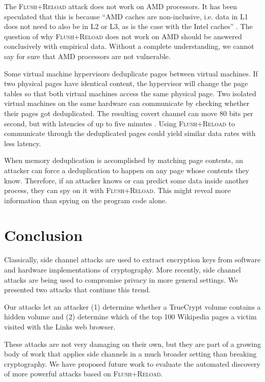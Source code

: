 \documentclass[letterpaper,twocolumn,10pt]{article}
\begin{document}
The \textsc{Flush+Reload} attack does not work on AMD processors. It has been
speculated that this is because ``AMD caches are non-inclusive, i.e. data in L1
does not need to also be in L2 or L3, as is the case with the Intel caches''
\cite{yarom2013flush}. The question of why \textsc{Flush+Reload} does not work
on AMD should be answered conclusively with empirical data. Without a complete
understanding, we cannot say for sure that AMD processors are not vulnerable. 

Some virtual machine hypervisors deduplicate pages between virtual machines. If
two physical pages have identical content, the hypervisor will change the page
tables so that both virtual machines access the same physical page. Two isolated
virtual machines on the same hardware can communicate by checking whether their
pages got deduplicated. The resulting covert channel can move 80 bits per
second, but with latencies of up to five minutes \cite{xiao2013security}. Using
\textsc{Flush+Reload} to communicate through the deduplicated pages could yield
similar data rates with less latency.

When memory deduplication is accomplished by matching page contents, an attacker
can force a deduplication to happen on any page whose contents they know.
Therefore, if an attacker knows or can predict some data inside another process,
they can spy on it with \textsc{Flush+Reload}. This might reveal more
information than spying on the program code alone.

\section{Conclusion}
\label{sec:conclusion}

Classically, side channel attacks are used to extract encryption keys from
software and hardware implementations of cryptography. More recently, side
channel attacks are being used to compromise privacy in more general settings.
We presented two attacks that continue this trend. 

Our attacks let an attacker (1) determine whether a TrueCrypt volume contains
a hidden volume and (2) determine which of the top 100 Wikipedia pages a victim
visited with the Links web browser.

These attacks are not very damaging on their own, but they are part of a growing
body of work that applies side channels in a much broader setting than breaking
cryptography. We have proposed future work to evaluate the automated discovery
of more powerful attacks based on \textsc{Flush+Reload}.
\end{document}
